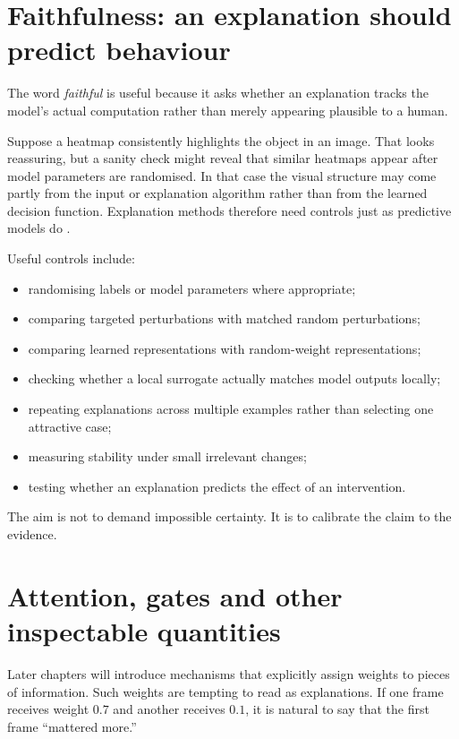 \section{Faithfulness: an explanation should predict behaviour}

The word \emph{faithful} is useful because it asks whether an explanation tracks the model's actual computation rather than merely appearing plausible to a human.

Suppose a heatmap consistently highlights the object in an image. That looks reassuring, but a sanity check might reveal that similar heatmaps appear after model parameters are randomised. In that case the visual structure may come partly from the input or explanation algorithm rather than from the learned decision function. Explanation methods therefore need controls just as predictive models do \parencite{adebayo2018}.

Useful controls include:
\begin{itemize}[leftmargin=*]
  \item randomising labels or model parameters where appropriate;
  \item comparing targeted perturbations with matched random perturbations;
  \item comparing learned representations with random-weight representations;
  \item checking whether a local surrogate actually matches model outputs locally;
  \item repeating explanations across multiple examples rather than selecting one attractive case;
  \item measuring stability under small irrelevant changes;
  \item testing whether an explanation predicts the effect of an intervention.
\end{itemize}

The aim is not to demand impossible certainty. It is to calibrate the claim to the evidence.

\section{Attention, gates and other inspectable quantities}

Later chapters will introduce mechanisms that explicitly assign weights to pieces of information. Such weights are tempting to read as explanations. If one frame receives weight \(0.7\) and another receives \(0.1\), it is natural to say that the first frame ``mattered more.''

